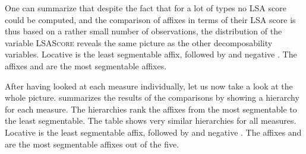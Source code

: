         One can summarize that despite the fact that for a lot of types no LSA score could be computed, and the comparison of affixes in terms of their LSA score is thus based on a rather small number of observations, the distribution of the variable \textsc{LSAScore} reveals the same picture as the other decomposability variables. Locative  is the least segmentable affix, followed by  and negative . The affixes  and  are the most segmentable affixes. 
        
                                                               
After having looked at each  measure individually, let us now take a look at the whole picture.  summarizes the results of the comparisons by showing a  hierarchy for each  measure. The  hierarchies rank the affixes from the most segmentable to the least segmentable. The table shows very similar hierarchies for all measures. Locative  is the least segmentable affix, followed by  and negative . The affixes  and  are the most segmentable affixes out of the five. 



